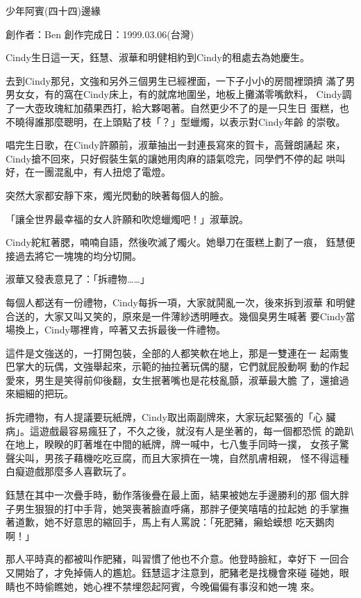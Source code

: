 



少年阿賓(四十四)邊緣

創作者：Ben
創作完成日：1999.03.06(台灣)


Cindy生日這一天，鈺慧、淑華和明健相約到Cindy的租處去為她慶生。

去到Cindy那兒，文強和另外三個男生已經裡面，一下子小小的房間裡頭擠
滿了男男女女，有的窩在Cindy床上，有的就席地圍坐，地板上攤滿零嘴飲料，
Cindy調了一大壺玫瑰紅加蘋果西打，給大夥喝著。自然更少不了的是一只生日
蛋糕，也不曉得誰那麼聰明，在上頭點了枝「？」型蠟燭，以表示對Cindy年齡
的崇敬。

唱完生日歌，在Cindy許願前，淑華抽出一封連長寫來的賀卡，高聲朗誦起
來，Cindy搶不回來，只好假裝生氣的讓她用肉麻的語氣唸完，同學們不停的起
哄叫好，在一團混亂中，有人扭熄了電燈。

突然大家都安靜下來，燭光閃動的映著每個人的臉。

「讓全世界最幸福的女人許願和吹熄蠟燭吧！」淑華說。

Cindy紽紅著腮，喃喃自語，然後吹滅了燭火。她舉刀在蛋糕上劃了一痕，
鈺慧便接過去將它一塊塊的均分切開。

淑華又發表意見了：「拆禮物……」

每個人都送有一份禮物，Cindy每拆一項，大家就鬨亂一次，後來拆到淑華
和明健合送的，大家又叫又笑的，原來是一件薄紗透明睡衣。幾個臭男生喊著
要Cindy當場換上，Cindy哪裡肯，啐著又去拆最後一件禮物。

這件是文強送的，一打開包裝，全部的人都笑軟在地上，那是一雙連在一
起兩隻巴掌大的玩偶，文強舉起來，示範的抽拉著玩偶的腿，它們就屁股動啊
動的作起愛來，男生是笑得前仰後翻，女生抿著嘴也是花枝亂顫，淑華最大膽
了，還搶過來細細的把玩。

拆完禮物，有人提議要玩紙牌，Cindy取出兩副牌來，大家玩起緊張的「心
臟病」。這遊戲最容易瘋狂了，不久之後，就沒有人是坐著的，每一個都恐慌
的跪趴在地上，睽睽的盯著堆在中間的紙牌，牌一喊中，七八隻手同時一撲，
女孩子驚聲尖叫，男孩子藉機吃吃豆腐，而且大家擠在一塊，自然肌膚相親，
怪不得這種白癡遊戲那麼多人喜歡玩了。

鈺慧在其中一次疊手時，動作落後疊在最上面，結果被她左手邊勝利的那
個大胖子男生狠狠的打中手背，她哭喪著臉直呼痛，那胖子便笑嘻嘻的拉起她
的手掌撫著道歉，她不好意思的縮回手，馬上有人罵說：「死肥豬，癩蛤蟆想
吃天鵝肉啊！」

那人平時真的都被叫作肥豬，叫習慣了他也不介意。他登時臉紅，幸好下
一回合又開始了，才免掉倆人的尷尬。鈺慧這才注意到，肥豬老是找機會來碰
碰她，眼睛也不時偷瞧她，她心裡不禁埋怨起阿賓，今晚偏偏有事沒和她一塊
來。

